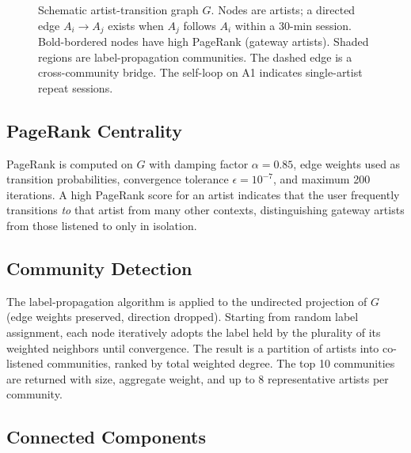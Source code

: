 \documentclass[conference]{IEEEtran}
\begin{document}
\begin{figure}[ht]
\caption{Schematic artist-transition graph $G$. Nodes are artists;
a directed edge $A_i \to A_j$ exists when $A_j$ follows $A_i$ within
a 30-min session. Bold-bordered nodes have high PageRank (gateway
artists). Shaded regions are label-propagation communities. The dashed
edge is a cross-community bridge. The self-loop on A1 indicates
single-artist repeat sessions.}
\label{fig:graph}
\end{figure}

\subsection{PageRank Centrality}

PageRank \cite{page1999pagerank} is computed on $G$ with damping factor
$\alpha = 0.85$, edge weights used as transition probabilities, convergence
tolerance $\epsilon = 10^{-7}$, and maximum 200 iterations. A high PageRank
score for an artist indicates that the user frequently transitions \emph{to}
that artist from many other contexts, distinguishing gateway artists from
those listened to only in isolation.

\subsection{Community Detection}

The label-propagation algorithm \cite{raghavan2007near} is applied to the
undirected projection of $G$ (edge weights preserved, direction dropped).
Starting from random label assignment, each node iteratively adopts the
label held by the plurality of its weighted neighbors until convergence.
The result is a partition of artists into co-listened communities, ranked
by total weighted degree. The top 10 communities are returned with size,
aggregate weight, and up to 8 representative artists per community.

\subsection{Connected Components}
\end{document}
